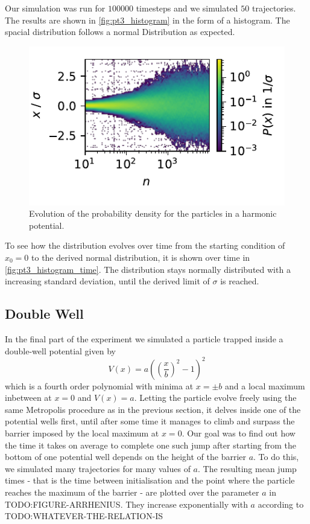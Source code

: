 \documentclass[
    parskip=half, 
    twoside=false,
    twocolumn=true,
    fontsize=11pt,
]{scrarticle}
\begin{document}
Our simulation was run for $100000$ timesteps and we simulated $50$ trajectories. 
The results are shown in \autoref{fig:pt3_histogram} in the form of a histogram.
The spacial distribution follows a normal Distribution as expected.


\begin{figure}
    \centering
    \includegraphics{figures/03 histogram evolution.pdf}
    \caption{
        Evolution of the probability density for the particles in a harmonic potential.
    }
    \label{fig:pt3_histogram_time}
\end{figure}
To see how the distribution evolves over time from the starting condition of $x_0=0$ to the derived normal distribution, it is shown over time in \autoref{fig:pt3_histogram_time}.
The distribution stays normally distributed with a increasing standard deviation, until the derived limit of $\sigma$ is reached.

\subsection{Double Well}

In the final part of the experiment we simulated a particle trapped inside a double-well potential given by
\begin{equation}
 V(x) = a\left(\left(\frac{x}{b}\right)^2-1\right)^2
\end{equation}
which is a fourth order polynomial with minima at $x=\pm b$ and a local maximum inbetween at $x=0$ and $V(x)=a$. Letting the particle evolve freely using the same Metropolis procedure as in the previous section, it delves inside one of the potential wells first, until after some time it manages to climb and surpass the barrier imposed by the local maximum at $x=0$. Our goal was to find out how the time it takes on average to complete one such jump after starting from the bottom of one potential well depends on the height of the barrier $a$. To do this, we simulated many trajectories for many values of $a$. The resulting mean jump times - that is the time between initialisation and the point where the particle reaches the maximum of the barrier - are plotted over the parameter $a$ in TODO:FIGURE-ARRHENIUS. They increase exponentially with $a$ according to TODO:WHATEVER-THE-RELATION-IS
\end{document}
